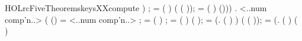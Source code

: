 \begin{SaveVerbatim}{HOLrcFiveTheoremskeysXXcompute}
                     ) ;
          = ( \HOLSymConst{\ensuremath{+}} )  ( \HOLSymConst{\HOLTokenProd{}} ( \HOLSymConst{\ensuremath{+}} ));
          = ( \HOLSymConst{\ensuremath{+}} )  
         (\HOLSymConst{,}\HOLSymConst{,}\HOLSymConst{,}\HOLSymConst{,}\HOLSymConst{,}))) \HOLSymConst{\HOLTokenConj{}}
   \HOLSymConst{\HOLTokenForall{}}  .
      <..num comp'n..>   \HOLSymConst{=}
     (
        (\HOLSymConst{,}\HOLSymConst{,}\HOLSymConst{,}\HOLSymConst{,}\HOLSymConst{,}) =  <..num comp'n..>  ;
         = (   \HOLSymConst{\ensuremath{+}}  \HOLSymConst{\ensuremath{+}} ) \HOLSymConst{\HOLTokenRol{}} ;
         = (   \HOLSymConst{\ensuremath{+}}  \HOLSymConst{\ensuremath{+}} ) \HOLSymConst{\HOLTokenRol{}}  ( \HOLSymConst{\ensuremath{+}} );
         =
            (\HOLTokenLambda{}.
                   \HOLSymConst{=}   (   \HOLSymConst{\ensuremath{+}}  \HOLSymConst{\ensuremath{+}} ) \HOLSymConst{\HOLTokenRol{}} 
                    ) ( \HOLSymConst{\HOLTokenProd{}} ( \HOLSymConst{\ensuremath{+}} ));
         =
            (\HOLTokenLambda{}.
                   \HOLSymConst{=}  
                   (   \HOLSymConst{\ensuremath{+}}  \HOLSymConst{\ensuremath{+}} ) \HOLSymConst{\HOLTokenRol{}}  ( \HOLSymConst{\ensuremath{+}} )

\end{SaveVerbatim}
